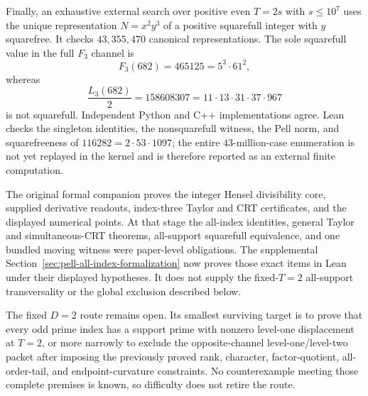 Finally, an exhaustive external search over positive even $T=2s$ with
$s\le10^7$ uses the unique representation $N=x^2y^3$ of a positive
squarefull integer with $y$ squarefree.  It checks $43{,}355{,}470$
canonical representations.  The sole squarefull value in the full
$F_3$ channel is
\[
 F_3(682)=465125=5^3\cdot61^2,
\]
whereas
\[
 \frac{L_3(682)}2=158608307
 =11\cdot13\cdot31\cdot37\cdot967
\]
is not squarefull.  Independent Python and C++ implementations agree.  Lean
checks the singleton identities, the nonsquarefull witness, the Pell norm,
and squarefreeness of $116282=2\cdot53\cdot1097$; the entire
$43$-million-case enumeration is not yet replayed in the kernel and is
therefore reported as an external finite computation.

The original formal companion proves the integer Hensel divisibility core,
supplied derivative readouts, index-three Taylor and CRT certificates, and the
displayed numerical points.  At that stage the all-index identities, general
Taylor and simultaneous-CRT theorems, all-support squarefull equivalence, and
one bundled moving witness were paper-level obligations.  The supplemental
Section~\ref{sec:pell-all-index-formalization} now proves those exact items in
Lean under their displayed hypotheses.  It does not supply the fixed-$T=2$
all-support transversality or the global exclusion described below.

The fixed $D=2$ route remains open.  Its smallest surviving target is to
prove that every odd prime index has a support prime with nonzero level-one
displacement at $T=2$, or more narrowly to exclude the opposite-channel
level-one/level-two packet after imposing the previously proved rank,
character, factor-quotient, all-order-tail, and endpoint-curvature
constraints.  No counterexample meeting those complete premises is known,
so difficulty does not retire the route.
